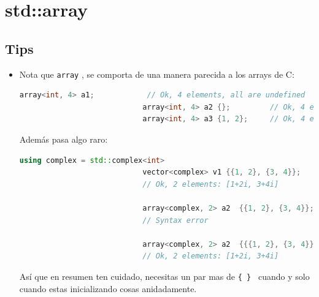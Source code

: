 \documentclass[12pt, fleqn]{report}                             %
\theoremstyle{break}                                            %
\newcommand{\textCode}[1]  { \texttt{#1} }                      %
\begin{document}
        \clearpage
        \section{std::array}

            \subsection{Tips}

                \begin{itemize}
                    \item 
                        
                        Nota que \textCode{array}, se comporta de una manera parecida a los arrays de C:
                        \begin{lstlisting}[language=C++, gobble=28]
                            array<int, 4> a1;            // Ok, 4 elements, all are undefined
                            array<int, 4> a2 {};         // Ok, 4 elements: [0, 0, 0, 0]
                            array<int, 4> a3 {1, 2};     // Ok, 4 elements: [1, 2, 0, 0]
                        \end{lstlisting}

                        Además pasa algo raro:
                        \begin{lstlisting}[language=C++, gobble=28]
                            using complex = std::complex<int>
                            vector<complex> v1 {{1, 2}, {3, 4}};      
                            // Ok, 2 elements: [1+2i, 3+4i]
                            
                            array<complex, 2> a2  {{1, 2}, {3, 4}};
                            // Syntax error
                            
                            array<complex, 2> a2  {{{1, 2}, {3, 4}}};
                            // Ok, 2 elements: [1+2i, 3+4i]
                        \end{lstlisting}

                        Así que en resumen ten cuidado, necesitas un par mas de \textCode{\{ \} }
                        cuando y solo cuando estas inicializando cosas anidadamente.
                \end{itemize}
\end{document}
